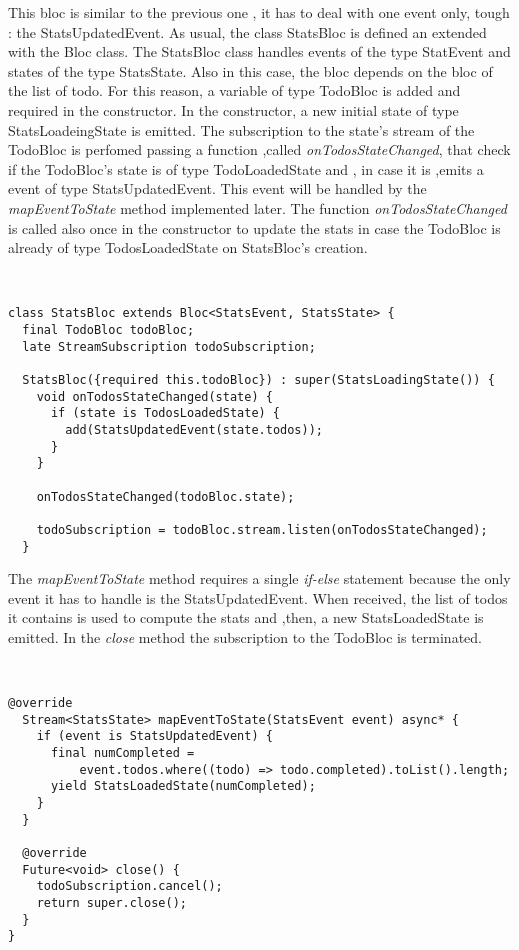 This bloc is similar to the previous one , it has to deal with one event only, tough : the StatsUpdatedEvent. As usual, the class StatsBloc is defined an extended with the Bloc class. The StatsBloc class handles events of the type StatEvent and states of the type StatsState. Also in this case, the bloc depends on the bloc of the list of todo. For this reason, a variable of type TodoBloc is added and required in the constructor. In the constructor, a new initial state of type StatsLoadeingState is emitted. The subscription to the state's stream of the TodoBloc is perfomed passing a function ,called \textit{onTodosStateChanged}, that check if the TodoBloc’s state is of type TodoLoadedState and , in case it is ,emits a event of type StatsUpdatedEvent. This event will be handled by the \textit{mapEventToState} method implemented later. The function \textit{onTodosStateChanged} is called also once in the constructor to update the stats in case the TodoBloc is already of type TodosLoadedState on StatsBloc's creation.
\begin{code}
\mbox{}\\
 \mbox{}
\label{code:2.14}
\begin{verbatim}
class StatsBloc extends Bloc<StatsEvent, StatsState> {
  final TodoBloc todoBloc;
  late StreamSubscription todoSubscription;

  StatsBloc({required this.todoBloc}) : super(StatsLoadingState()) {
    void onTodosStateChanged(state) {
      if (state is TodosLoadedState) {
        add(StatsUpdatedEvent(state.todos));
      }
    }

    onTodosStateChanged(todoBloc.state);

    todoSubscription = todoBloc.stream.listen(onTodosStateChanged);
  }
\end{verbatim}
\mbox{}
\end{code}

The \textit{mapEventToState} method requires a single \textit{if-else} statement because the only event it has to handle is the StatsUpdatedEvent. When received, the list of todos it contains is used to compute the stats and ,then, a new StatsLoadedState is emitted. 
In the \textit{close} method the subscription to the TodoBloc is terminated.

  \begin{code}
\mbox{}\\
 \mbox{}
\label{code:2.14}
\begin{verbatim}
@override
  Stream<StatsState> mapEventToState(StatsEvent event) async* {
    if (event is StatsUpdatedEvent) {
      final numCompleted =
          event.todos.where((todo) => todo.completed).toList().length;
      yield StatsLoadedState(numCompleted);
    }
  }

  @override
  Future<void> close() {
    todoSubscription.cancel();
    return super.close();
  }
}
\end{verbatim}
\mbox{}
\end{code}


